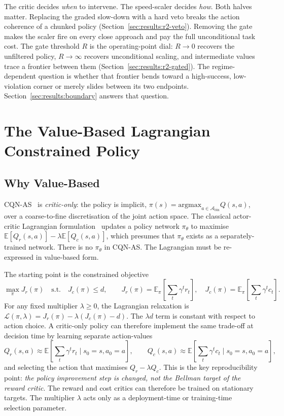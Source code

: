 \documentclass[11pt,a4paper]{report}
\newcommand{\cqnas}{CQN-AS}
\begin{document}
The critic decides \emph{when} to intervene. The speed-scaler decides
\emph{how}. Both halves matter. Replacing the graded slow-down with a
hard veto breaks the action coherence of a chunked policy
(Section~\ref{sec:results:r2-veto}). Removing the gate makes the
scaler fire on every close approach and pay the full unconditional
task cost. The gate threshold $R$ is the operating-point dial:
$R \to 0$ recovers the unfiltered policy, $R \to \infty$ recovers
unconditional scaling, and intermediate values trace a frontier
between them (Section~\ref{sec:results:r2-gated}). The
regime-dependent question is whether that frontier bends toward a
high-success, low-violation corner or merely slides between its two
endpoints. Section~\ref{sec:results:boundary} answers that question.

\section{The Value-Based Lagrangian Constrained Policy}
\label{sec:method:lagrangian}

\subsection{Why Value-Based}
\label{sec:method:lagrangian:why}

\cqnas{}~\cite{seo2024cqnas} is \emph{critic-only}: the policy is
implicit, $\pi(s) = \mathrm{argmax}_{a \in
\mathcal{A}_{\mathrm{bin}}} Q(s, a)$, over a coarse-to-fine
discretisation of the joint action space. The classical
actor-critic Lagrangian formulation~\cite{ray2019safetygym,
stooke2020pid} updates a policy network $\pi_\theta$ to maximise
$\mathbb{E}[Q_r(s,a)] - \lambda \mathbb{E}[Q_c(s,a)]$, which
presumes that $\pi_\theta$ exists as a separately-trained network.
There is no $\pi_\theta$ in \cqnas{}. The Lagrangian must be
re-expressed in value-based form.

The starting point is the constrained objective
\begin{equation}
  \max_{\pi} J_r(\pi)
  \quad \text{s.t.} \quad
  J_c(\pi) \le d,
  \qquad
  J_r(\pi)=\mathbb{E}_{\pi}\!\left[\sum_t \gamma^t r_t\right],
  \quad
  J_c(\pi)=\mathbb{E}_{\pi}\!\left[\sum_t \gamma^t c_t\right].
  \label{eq:cmdp-objective}
\end{equation}
For any fixed multiplier $\lambda \ge 0$, the Lagrangian relaxation is
$\mathcal{L}(\pi,\lambda)=J_r(\pi)-\lambda(J_c(\pi)-d)$. The
$\lambda d$ term is constant with respect to action choice. A
critic-only policy can therefore implement the same trade-off at
decision time by learning separate action-values
\[
Q_r(s,a)\approx\mathbb{E}\!\left[\sum_t\gamma^t r_t\mid s_0=s,a_0=a\right],
\qquad
Q_c(s,a)\approx\mathbb{E}\!\left[\sum_t\gamma^t c_t\mid s_0=s,a_0=a\right],
\]
and selecting the action that maximises $Q_r-\lambda Q_c$. This is the
key reproducibility point: \emph{the policy improvement step is
changed, not the Bellman target of the reward critic}. The reward and
cost critics can therefore be trained on stationary targets. The
multiplier $\lambda$ acts only as a deployment-time or training-time
selection parameter.
\end{document}
